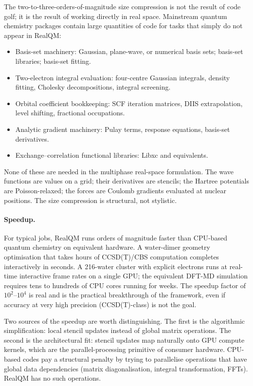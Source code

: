 The two-to-three-orders-of-magnitude size compression is not the result of code golf; it is the result of working directly in real space. Mainstream quantum chemistry packages contain large quantities of code for tasks that simply do not appear in RealQM:
\begin{itemize}
\item Basis-set machinery: Gaussian, plane-wave, or numerical basis sets; basis-set libraries; basis-set fitting.
\item Two-electron integral evaluation: four-centre Gaussian integrals, density fitting, Cholesky decompositions, integral screening.
\item Orbital coefficient bookkeeping: SCF iteration matrices, DIIS extrapolation, level shifting, fractional occupations.
\item Analytic gradient machinery: Pulay terms, response equations, basis-set derivatives.
\item Exchange--correlation functional libraries: Libxc and equivalents.
\end{itemize}
None of these are needed in the multiphase real-space formulation. The wave functions are values on a grid; their derivatives are stencils; the Hartree potentials are Poisson-relaxed; the forces are Coulomb gradients evaluated at nuclear positions. The size compression is structural, not stylistic.

\paragraph{Speedup.} For typical jobs, RealQM runs orders of magnitude faster than CPU-based quantum chemistry on equivalent hardware. A water-dimer geometry optimisation that takes hours of CCSD(T)/CBS computation completes interactively in seconds. A 216-water cluster with explicit electrons runs at real-time interactive frame rates on a single GPU; the equivalent DFT-MD simulation requires tens to hundreds of CPU cores running for weeks. The speedup factor of $10^2$--$10^4$ is real and is the practical breakthrough of the framework, even if accuracy at very high precision (CCSD(T)-class) is not the goal.

Two sources of the speedup are worth distinguishing. The first is the algorithmic simplification: local stencil updates instead of global matrix operations. The second is the architectural fit: stencil updates map naturally onto GPU compute kernels, which are the parallel-processing primitive of consumer hardware. CPU-based codes pay a structural penalty by trying to parallelise operations that have global data dependencies (matrix diagonalisation, integral transformation, FFTs). RealQM has no such operations.

